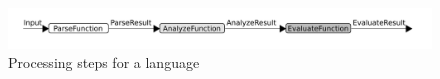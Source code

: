 \section{}
\label{sec:function-comp}

\begin{figure}[h]
  \includegraphics[width=\textwidth]{unit-flow}
  \caption{Processing steps for a language }
  \label{fig:unit-flow}
\end{figure}
